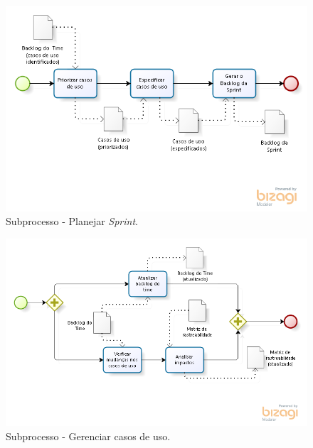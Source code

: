     \begin{figure}[!htbp]
      \centering
      \includegraphics[scale=0.5]{editaveis/figuras/processo_planejar_sprint}
      \caption[Subprocesso - Planejar \textit{Sprint}]{Subprocesso - Planejar \textit{Sprint}.}
      \label{processo_planejar_sprint}
    \end{figure}

    \begin{figure}[!htbp]
      \centering
      \includegraphics[scale=0.55]{editaveis/figuras/processo_gerenciar_casos_uso}
      \caption[Subprocesso - Gerenciar casos de uso]{Subprocesso - Gerenciar casos de uso.}
      \label{processo_gerenciar_casos_uso}
    \end{figure}